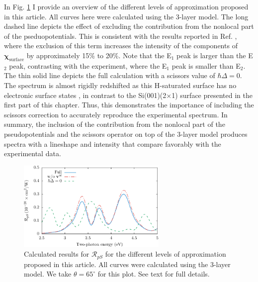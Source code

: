 In Fig. \ref{fig:improvements} I provide an overview of the different levels of
approximation proposed in this article. All curves here were calculated using
the 3-layer model. The long dashed line depicts the effect of excluding the
contribution from the nonlocal part of the pseduopotentials. This is consistent
with the results reported in Ref. \cite{andersonPRB15}, where the exclusion of
this term increases the intensity of the components of
$\boldsymbol{\chi}_{\mathrm{surface}}$ by approximately 15\% to 20\%. Note that
the E$_{1}$ peak is larger than the E$_{2}$ peak, contrasting with the
experiment, where the E$_{1}$ peak is smaller than E$_{2}$. The thin solid line
depicts the full calculation with a scissors value of $\hbar\Delta = 0$. The
spectrum is almost rigidly redshifted as this H-saturated surface has no
electronic surface states \cite{andersonPRB15}, in contrast to the
Si(001)(2$\times$1) surface presented in the first part of this chapter. Thus,
this demonstrates the importance of including the scissors correction to
accurately reproduce the experimental spectrum. In summary, the inclusion of the
contribution from the nonlocal part of the pseudopotentials and the scissors
operator on top of the 3-layer model produces spectra with a lineshape and
intensity that compare favorably with the experimental data.

\begin{figure}[t]
\centering
\includegraphics[width=0.64\textwidth]
{content/figures/fig-Si1x1-Mejia_RpS_improvements}
\caption[$\mathcal{R}_{pS}$ calculated with different levels of appoximation.]
{Calculated results for $\mathcal{R}_{pS}$ for the different levels of
approximation proposed in this article. All curves were calculated using the
3-layer model. We take $\theta=65^{\circ}$ for this plot. See text for full
details.}
\label{fig:improvements}
\end{figure}

